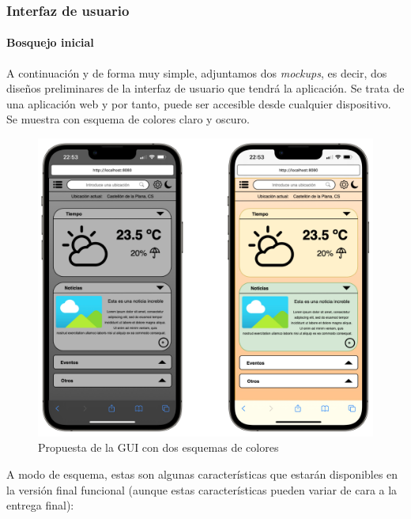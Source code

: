 \documentclass[../ei103948-project-documentation.tex]{subfiles}
\begin{document}
                                \newpage
                                \subsubsection{Interfaz de usuario}
                                    \paragraph{Bosquejo inicial}
                                A continuación y de forma muy simple, adjuntamos dos \textit{mockups}, es decir, dos diseños preliminares de la interfaz de usuario que tendrá la aplicación. Se trata de una aplicación web y por tanto, puede ser accesible desde cualquier dispositivo. Se muestra con esquema de colores claro y oscuro.
                                \begin{figure}[H]
                                    \begin{center}
                                    \includegraphics[scale=0.18]{images/GuiTelefono.png}
                                    \end{center}
                                    \caption{Propuesta de la GUI con dos esquemas de colores}
                                \end{figure}
                                A modo de esquema, estas son algunas características que estarán disponibles en la versión final funcional (aunque estas características pueden variar de cara a la entrega final):
                        
\end{document}
